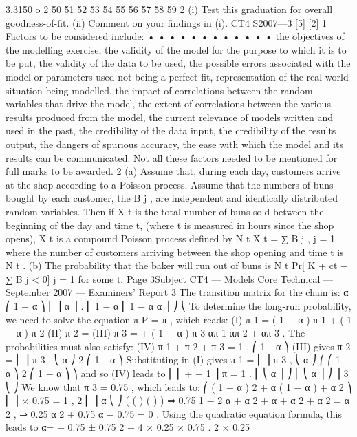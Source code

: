 \documentclass[a4paper,12pt]{article}
\begin{document}
\begin{enumerate}
3.3150
o
2
50
51
52
53
54
55
56
57
58
59
2
(i) Test this graduation for overall goodness-of-fit.
(ii) Comment on your findings in (i).
CT4 S2007—3
[5]
[2]
1
Factors to be considered include:
•
•
•
•
•
•
•
•
•
•
•
•
the objectives of the modelling exercise,
the validity of the model for the purpose to which it is to be put,
the validity of the data to be used,
the possible errors associated with the model or parameters used not being a
perfect fit,
representation of the real world situation being modelled,
the impact of correlations between the random variables that drive the model,
the extent of correlations between the various results produced from the model,
the current relevance of models written and used in the past,
the credibility of the data input,
the credibility of the results output,
the dangers of spurious accuracy,
the ease with which the model and its results can be communicated.
Not all these factors needed to be mentioned for full marks to be awarded.
2
(a)
Assume that, during each day, customers arrive at the shop according to a
Poisson process.
Assume that the numbers of buns bought by each customer, the B j , are
independent and identically distributed random variables.
Then if X t is the total number of buns sold between the beginning of the day
and time t, (where t is measured in hours since the shop opens), X t is a
compound Poisson process defined by
N t
X t = ∑ B j ,
j = 1
where the number of customers arriving between the shop opening and time t
is N t .
(b)
The probability that the baker will run out of buns is
N t
Pr[ K + ct − ∑ B j < 0]
j = 1
for some t.
Page 3Subject CT4 — Models Core Technical — September 2007 — Examiners’ Report
3
The transition matrix for the chain is:
α
⎛ 1 − α
⎞
⎜
⎟
α ⎟ .
⎜ 1 − α
⎜
1 − α α ⎟ ⎠
⎝
To determine the long-run probability, we need to solve the equation π P = π , which
reads:
(I) π 1 = ( 1 − α ) π 1 + ( 1 − α ) π 2
(II) π 2 =
(III) π 3 =
+ ( 1 − α ) π 3
απ 1
απ 2
+
απ 3 .
The probabilities must also satisfy:
(IV)
π 1 + π 2 + π 3 = 1 .
⎛ 1− α ⎞
(III) gives π 2 = ⎜
⎟ π 3 .
⎝ α ⎠
2
⎛ 1− α ⎞
Substituting in (I) gives π 1 = ⎜
⎟ π 3 ,
⎝ α ⎠
⎛ ⎛ 1 − α ⎞ 2 ⎛ 1 − α ⎞ ⎞
and so (IV) leads to ⎜ ⎜
+
+ 1 ⎟ π = 1 .
⎜ ⎝ α ⎟ ⎠ ⎜ ⎝ α ⎟ ⎠ ⎟ 3
⎝
⎠
We know that π 3 = 0.75 , which leads to:
⎛ ( 1 − α ) 2 + α ( 1 − α ) + α 2 ⎞
⎜
⎟ × 0.75 = 1 ,
2
⎜
⎟
α
⎝
⎠
( (
) (
)
)
⇒ 0.75 1 − 2 α + α 2 + α + α 2 + α 2 = α 2 ,
⇒ 0.25 α 2 + 0.75 α − 0.75 = 0 .
Using the quadratic equation formula, this leads to
α=
− 0.75 ± 0.75 2 + 4 × 0.25 × 0.75
.
2 × 0.25

\end{enumerate}
\end{document}
